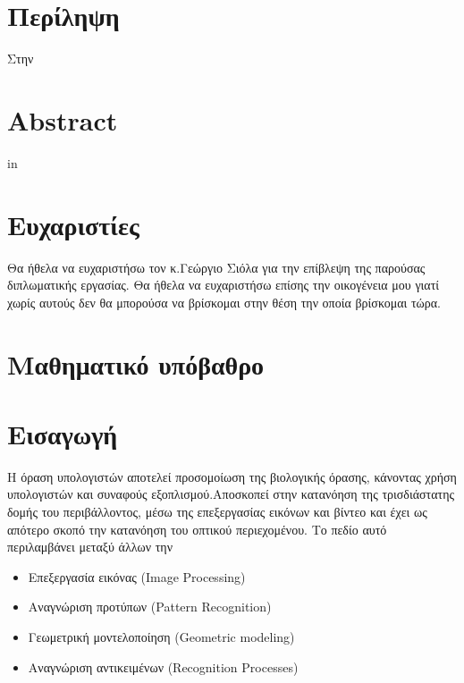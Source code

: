\documentclass[12pt]{article}
\numberwithin{equation}{section}
\begin{document}
\newpage
\mbox{}
\newpage

\section*{Περίληψη}
Στην


\newpage
\mbox{}
\newpage

\section*{Abstract}
in



\newpage
\mbox{}
\newpage

\section*{Ευχαριστίες}
Θα ήθελα να ευχαριστήσω τον κ.Γεώργιο Σιόλα για την επίβλεψη της παρούσας διπλωματικής εργασίας. Θα ήθελα να ευχαριστήσω επίσης την οικογένεια μου γιατί χωρίς αυτούς δεν θα μπορούσα να βρίσκομαι στην θέση την οποία βρίσκομαι τώρα.


\newpage
\mbox{}
\newpage


\tableofcontents

\newpage
\listoffigures
{}

\newpage
\listoftables
{}

\newpage
{}
\section{Μαθηματικό υπόβαθρο}

\section{Εισαγωγή}

Η όραση υπολογιστών αποτελεί προσομοίωση της βιολογικής όρασης, κάνοντας χρήση υπολογιστών και συναφούς εξοπλισμού.Αποσκοπεί στην κατανόηση της τρισδιάστατης δομής του περιβάλλοντος, μέσω της επεξεργασίας εικόνων και βίντεο και έχει ως απότερο σκοπό την κατανόηση του οπτικού περιεχομένου. Το πεδίο αυτό περιλαμβάνει μεταξύ άλλων την

\begin{itemize}
    \item Επεξεργασία εικόνας (Image Processing)
    \item Αναγνώριση προτύπων (Pattern Recognition)
    \item Γεωμετρική μοντελοποίηση (Geometric modeling)
    \item Αναγνώριση αντικειμένων (Recognition Processes)
\end{itemize}
\end{document}
